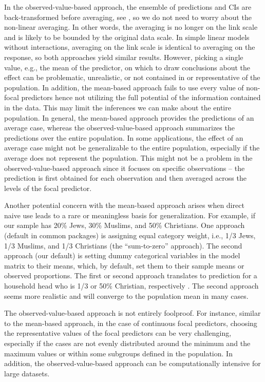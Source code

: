 In the observed-value-based approach, the ensemble of predictions and CIs are back-transformed before averaging, see , so we do not need to worry about the non-linear averaging. In other words, the averaging is no longer on the link scale and is likely to be bounded by the original data scale. In simple linear models without interactions, averaging on the link scale is identical to averaging on the response, so both approaches yield similar results. However, picking a single value, e.g., the mean of the predictor, on which to draw conclusions about the effect can be problematic, unrealistic, or not contained in or representative of the population. In addition, the mean-based approach fails to use every value of non-focal predictors hence not utilizing the full potential of the information contained in the data. This may limit the inferences we can make about the entire population. In general, the mean-based approach provides the predictions of an average case, whereas the observed-value-based approach summarizes the predictions over the entire population. In some applications, the effect of an average case might not be generalizable to the entire population, especially if the average does not represent the population. This might not be a problem in the observed-value-based approach since it focuses on specific observations -- the prediction is first obtained for each observation and then averaged across the levels of the focal predictor.

Another potential concern with the mean-based approach arises when direct naive use leads to a rare or meaningless basis for generalization. For example, if our sample has 20\% Jews, 30\% Muslims, and 50\% Christians. One approach (default in common packages) is assigning equal category weight, i.e., 1/3 Jews, 1/3 Muslims, and 1/3 Christians (the ``sum-to-zero'' approach). The second approach (our default) is setting dummy categorical variables in the model matrix to their means, which, by default, set them to their sample means or observed proportions. The first or second approach translates to prediction for a household head who is 1/3 or 50\% Christian, respectively \citep{hanmer2013behind}. The second approach seems more realistic and will converge to the population mean in many cases.

The observed-value-based approach is not entirely foolproof. For instance, similar to the mean-based approach, in the case of continuous focal predictors, choosing the representative values of the focal predictors can be very challenging, especially if the cases are not evenly distributed around the minimum and the maximum values or within some subgroups defined in the population. In addition, the observed-value-based approach can be computationally intensive for large datasets.


